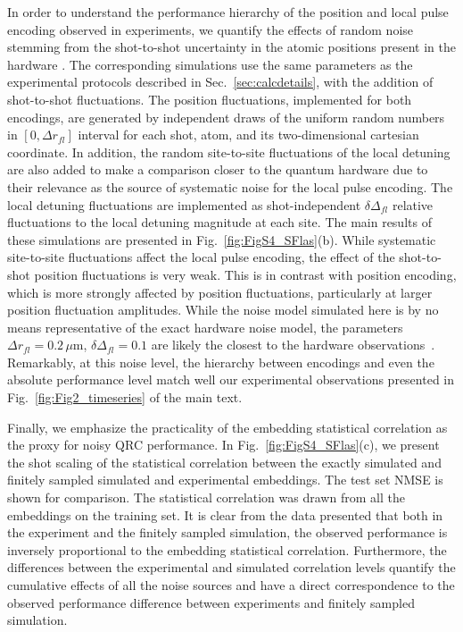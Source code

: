 \documentclass[english,floatfix,twocolumn,showpacs, aps, prx, reprint, superscriptaddress, longbibliography]{revtex4-2}
\begin{document}
In order to understand the performance hierarchy of the position and local pulse encoding observed in experiments, we quantify the effects of random noise stemming from the shot-to-shot uncertainty in the atomic positions present in the hardware \cite{Wurtz2023}. The corresponding simulations use the same parameters as the experimental protocols described in Sec.~\ref{sec:calcdetails}, with the addition of shot-to-shot fluctuations. The position fluctuations, implemented for both encodings, are generated by independent draws of the uniform random numbers in $[0, \Delta r_{fl}]$ interval for each shot, atom, and its two-dimensional cartesian coordinate. In addition, the random site-to-site fluctuations of the local detuning are also added to make a comparison closer to the quantum hardware due to their relevance as the source of systematic noise for the local pulse encoding. The local detuning fluctuations are implemented as shot-independent $\delta \Delta_{fl}$ relative fluctuations to the local detuning magnitude at each site. The main results of these simulations are presented in Fig.~\ref{fig:FigS4_SFlas}(b). While systematic site-to-site fluctuations affect the local pulse encoding, the effect of the shot-to-shot position fluctuations is very weak. This is in contrast with position encoding, which is more strongly affected by position fluctuations, particularly at larger position fluctuation amplitudes. While the noise model simulated here is by no means representative of the exact hardware noise model, the parameters $\Delta r_{fl}= 0.2 \, \mu \mathrm{m}$, $\delta \Delta_{fl}=0.1$ are likely the closest to the hardware observations~\cite{Wurtz2023}. Remarkably, at this noise level, the hierarchy between encodings and even the absolute performance level match well our experimental observations presented in Fig.~\ref{fig:Fig2_timeseries} of the main text. 


Finally, we emphasize the practicality of the embedding statistical correlation as the proxy for noisy QRC performance. In Fig.~\ref{fig:FigS4_SFlas}(c), we present the shot scaling of the statistical correlation between the exactly simulated and finitely sampled simulated and experimental embeddings. The test set NMSE is shown for comparison. The statistical correlation was drawn from all the embeddings on the training set. It is clear from the data presented that both in the experiment and the finitely sampled simulation, the observed performance is inversely proportional to the embedding statistical correlation. Furthermore, the differences between the experimental and simulated correlation levels quantify the cumulative effects of all the noise sources and have a direct correspondence to the observed performance difference between experiments and finitely sampled simulation.
\end{document}
